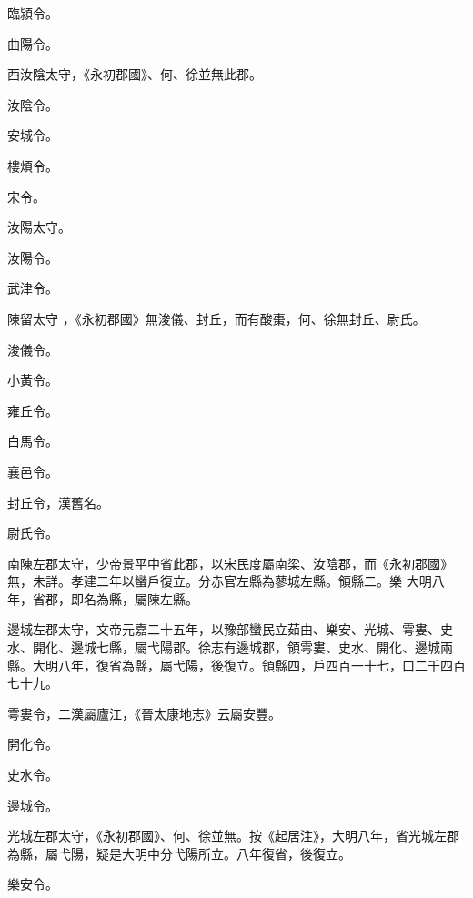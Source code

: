 \begin{pinyinscope}
臨潁令。


曲陽令。



 西汝陰太守，《永初郡國》、何、徐並無此郡。


汝陰令。


安城令。


樓煩令。


宋令。


汝陽太守。


汝陽令。



 武津令。


陳留太守
 ，《永初郡國》無浚儀、封丘，而有酸棗，何、徐無封丘、尉氏。


浚儀令。


小黃令。


雍丘令。


白馬令。


襄邑令。



 封丘令，漢舊名。


尉氏令。


南陳左郡太守，少帝景平中省此郡，以宋民度屬南梁、汝陰郡，而《永初郡國》無，未詳。孝建二年以蠻戶復立。分赤官左縣為蓼城左縣。領縣二。樂
 大明八年，省郡，即名為縣，屬陳左縣。



 邊城左郡太守，文帝元嘉二十五年，以豫部蠻民立茹由、樂安、光城、雩婁、史水、開化、邊城七縣，屬弋陽郡。徐志有邊城郡，領雩婁、史水、開化、邊城兩縣。大明八年，復省為縣，屬弋陽，後復立。領縣四，戶四百一十七，口二千四百七十九。



 雩婁令，二漢屬廬江，《晉太康地志》云屬安豐。



 開化令。



 史水令。



 邊城令。



 光城左郡太守，《永初郡國》、何、徐並無。按《起居注》，大明八年，省光城左郡為縣，屬弋陽，疑是大明中分弋陽所立。八年復省，後復立。



 樂安令。




\end{pinyinscope}
